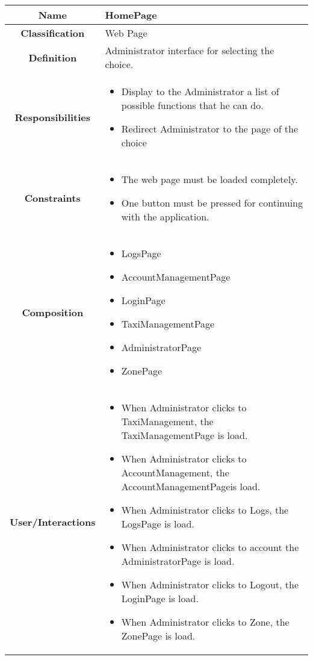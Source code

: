 \documentclass[11pt, a4paper,titlepage]{article}
\begin{document}
\begin{enumerate}
\begin{tabularx}{\textwidth}{| c | X |}
	\hline
	\textbf{Name} & 
	HomePage
	\\
	\hline
	\textbf{Classification} & 
	Web Page
	\\
	\hline
	\textbf{Definition} & 
	Administrator interface for selecting the choice.
	\\
	\hline
	\textbf{Responsibilities} &
	\begin{itemize}
		\item 
		Display to the Administrator a list of possible functions that he can do.
		\item Redirect Administrator to the page of the choice
	\end{itemize}
	\\
	\hline
	\textbf{Constraints} & 
	\begin{itemize}
		\item  The web page must be loaded completely.
		\item One button must be pressed for continuing with the application.
	\end{itemize}
	\\
	\hline
	\textbf{Composition} & 
	\begin{itemize}
		\item LogsPage
		\item AccountManagementPage    
		\item LoginPage
		\item TaxiManagementPage    
		\item AdministratorPage
		\item ZonePage
	\end{itemize}
	\\
	\hline
	\textbf{User/Interactions} & 
	\begin{itemize}
		\item 
		When Administrator clicks to TaxiManagement, the TaxiManagementPage is load.        
		\item When Administrator clicks to AccountManagement, the AccountManagementPageis load.
		\item When Administrator  clicks to Logs, the LogsPage is load.
		\item When Administrator clicks to account the AdministratorPage is load.        
		\item When Administrator clicks to Logout, the LoginPage is load.
		\item When Administrator  clicks to Zone, the ZonePage is load.
	\end{itemize}	
	\\
	\hline	
\end{tabularx}


\end{enumerate}
\end{document}
